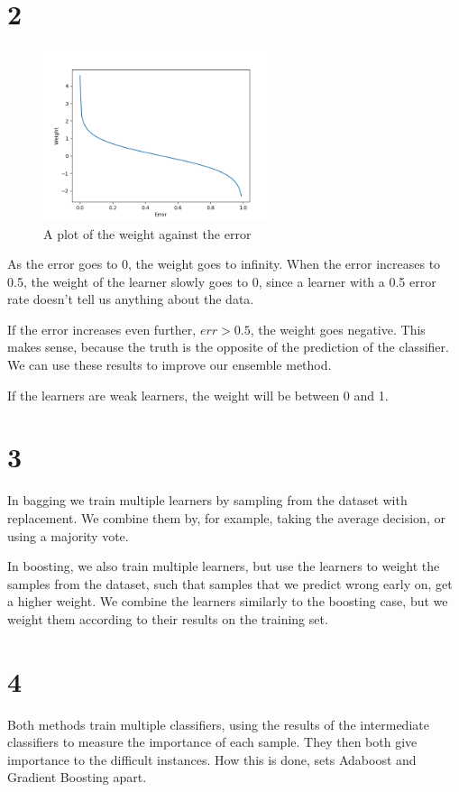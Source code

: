 \documentclass[11pt]{article}
\begin{document}
\section*{2}

\begin{figure}[h]
	\centering
	\includegraphics[width=0.6\textwidth]{images/ex2_2}
	\caption{A plot of the weight against the error}
\end{figure}
As the error goes to 0, the weight goes to infinity. When the error increases to 0.5, the weight of the learner slowly goes to 0, since a learner with a 0.5 error rate doesn't tell us anything about the data. 

If the error increases even further, $err>0.5$, the weight goes negative. This makes sense, because the truth is the opposite of the prediction of the classifier. We can use these results to improve our ensemble method.

If the learners are weak learners, the weight will be between 0 and 1.

\section*{3}

In bagging we train multiple learners by sampling from the dataset with replacement. We combine them by, for example, taking the average decision, or using a majority vote.

In boosting, we also train multiple learners, but use the learners to weight the samples from the dataset, such that samples that we predict wrong early on, get a higher weight. We combine the learners similarly to the boosting case, but we weight them according to their results on the training set.

\section*{4}
Both methods train multiple classifiers, using the results of the intermediate classifiers to measure the importance of each sample. They then both give importance to the difficult instances. How this is done, sets Adaboost and Gradient Boosting apart.
\end{document}
